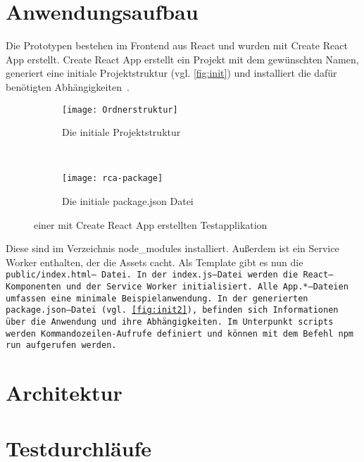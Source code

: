 \section{\label{chap:aufbau}Anwendungsaufbau}
Die Prototypen bestehen im Frontend aus React und wurden mit Create React App erstellt. Create React App erstellt ein Projekt mit dem gewünschten Namen, generiert eine initiale Projektstruktur (vgl. \autoref{fig:init}) und installiert die dafür benötigten Abhängigkeiten~\cite{create-react}.
\begin{figure}[H]
  \centering
  \begin{subfigure}[t]{0.4\textwidth}
          \texttt{[image: Ordnerstruktur]}
          \caption{Die initiale Projektstruktur}
          \label{fig:init}
  \end{subfigure}
  ~
  \begin{subfigure}[t]{0.4\textwidth}
          \texttt{[image: rca-package]}
          \caption{Die initiale package.json Datei}
          \label{fig:init2}
  \end{subfigure}
  \grayRule
  \caption[Create React App: initiale Testapplikation]{einer mit Create React App erstellten Testapplikation}
  \label{fig:create-react-app}
\end{figure}
%
Diese sind im Verzeichnis node\_modules installiert.
Außerdem ist ein Service Worker enthalten, der die \gls{Assets} cacht.
Als Template gibt es nun die \tt{public/index.html}-- Datei. In der \tt{index.js}--Datei werden die React--Komponenten und der Service Worker initialisiert.
Alle \tt{App.*}--Dateien umfassen eine minimale Beispielanwendung.
In der generierten \tt{package.json}--Datei (vgl. \autoref{fig:init2}), befinden sich Informationen über die Anwendung und ihre Abhängigkeiten.
Im Unterpunkt \tt{scripts} werden Kommandozeilen-Aufrufe definiert und können mit dem Befehl \tt{npm run} aufgerufen werden.
%
%

%
%
%
\section{Architektur}

%
%

%
%

%
%

%
%
\section{\label{chap:konzept:test}Testdurchläufe}

